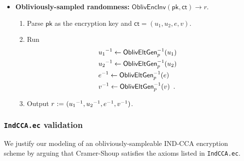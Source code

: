 \documentclass[11pt,letterpaper]{article}
\theoremstyle{plain} %
\theoremstyle{definition} %
\theoremstyle{remark} %
\newcommand{\code}[1]{\texttt{#1}} %
\newcommand{\eqdef}{\ {:=} \ }
\newcommand{\OblivEncInv}{\mathsf{OblivEncInv}}
\newcommand{\EncKey}{\mathsf{pk}}
\newcommand{\Ct}{\mathsf{ct}}
\newcommand{\Rand}{r}
\newcommand{\GrpEltE}{e}
\newcommand{\GrpEltU}{u}
\newcommand{\GrpEltV}{v}
\begin{document}
\begin{itemize}[nolistsep]
    \item \textbf{Obliviously-sampled randomness:} $\OblivEncInv(\EncKey, \Ct) \to \Rand$.
    \begin{enumerate}[nolistsep]
        \item Parse $\EncKey$ as the encryption key and $\Ct = (\GrpEltU_1,\GrpEltU_2,\GrpEltE,\GrpEltV)$.
        \item Run
        \begin{align*}
            &\Inv{\GrpEltU_1} \gets \OblivEltInv_{\MultGrpOrd}(\GrpEltU_1)\\
            &\Inv{\GrpEltU_2} \gets \OblivEltInv_{\MultGrpOrd}(\GrpEltU_2)\\
            &\Inv{\GrpEltE} \gets \OblivEltInv_{\MultGrpOrd}(\GrpEltE)\\
            &\Inv{\GrpEltV} \gets \OblivEltInv_{\MultGrpOrd}(\GrpEltV)
            \enspace.
        \end{align*}
        \item Output $\Rand \eqdef (\Inv{\GrpEltU_1}, \Inv{\GrpEltU_2}, \Inv{\GrpEltE}, \Inv{\GrpEltV})$.
    \end{enumerate}
\end{itemize}

\subsubsection{\code{IndCCA.ec} validation}
\label{sec:indcca-model-validation}

We justify our modeling of an obliviously-sampleable IND-CCA encryption scheme by arguing that Cramer-Shoup satisfies the axioms listed in \code{IndCCA.ec}.
\end{document}
